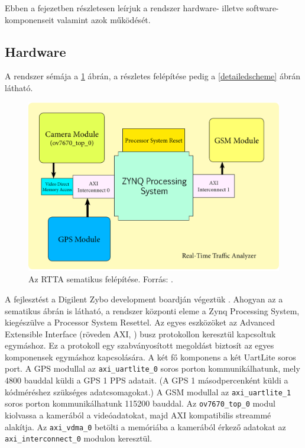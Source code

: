 \documentclass[a4paper,12pt]{report}
\begin{document}
Ebben a fejezetben részletesen leírjuk a rendszer hardware- illetve software-komponenseit valamint azok működését.

\subsection{Hardware}
\label{rttahw}

A rendszer sémája a \ref{rttaschema} ábrán, a részletes felépítése pedig a \ref{detailedscheme} ábrán látható.

\begin{figure}[h]
\centerline{
\includegraphics[width=6in]{img/sema}}
\caption{Az RTTA sematikus felépítése. Forrás: \cite{usingcoginfocom}.}
\label{rttaschema}
\end{figure}  

A fejlesztést a Digilent Zybo development boardján végeztük \cite{zybo}. Ahogyan az a sematikus ábrán is látható, a rendszer központi eleme a Zynq Processing System, kiegészülve a Processor System Resettel. Az egyes eszközöket az Advanced Extensible Interface (röveden AXI, \cite{xilinx1999reference}) busz protokollon keresztül kapcsoltuk egymáshoz. Ez a protokoll egy szabványosított megoldást biztosít az egyes komponensek egymáshoz kapcsolására. A két fő komponens a két UartLite soros port. A GPS modullal az \texttt{axi\_uartlite\_0} soros porton kommunikálhatunk, mely 4800 bauddal küldi a GPS 1 PPS adatait. (A GPS 1 másodpercenként küldi a kódméréshez szükséges adatcsomagokat.) A GSM modullal az \texttt{axi\_uartlite\_1} soros porton kommunikálhatunk 115200 bauddal. Az \texttt{ov7670\_top\_0} modul kiolvassa a kamerából a videóadatokat, majd AXI kompatibilis streammé alakítja. Az \texttt{axi\_vdma\_0} betölti a memóriába a kamerából érkező adatokat az \texttt{axi\_interconnect\_0} modulon keresztül.
\end{document}
